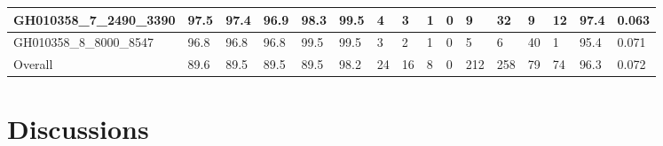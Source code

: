 \begin{table}[]
{\begin{tabular}{|l|l|l|l|l|l|l|l|l|l|l|l|l|l|l|l|}
			GH010358\_7\_2490\_3390   & 97.5       & 97.4      & 96.9      & 98.3                                                   & 99.5                                                   & 4    & 3                                                    & 1                                                    & 0                                                    & 9    & 32   & 9                                                     & 12                                                   & 97.4       & 0.063  \\ \hline
			GH010358\_8\_8000\_8547   & 96.8       & 96.8      & 96.8      & 99.5                                                   & 99.5                                                   & 3    & 2                                                    & 1                                                    & 0                                                    & 5    & 6    & 40                                                    & 1                                                    & 95.4       & 0.071  \\ \hline
			Overall                   & 89.6       & 89.5      & 89.5      & 89.5                                                   & 98.2                                                   & 24   & 16                                                   & 8                                                    & 0                                                    & 212  & 258  & 79                                                    & 74                                                   & 96.3       & 0.072  \\ \hline
		\end{tabular}%
	}
\end{table}
\section{Discussions}

